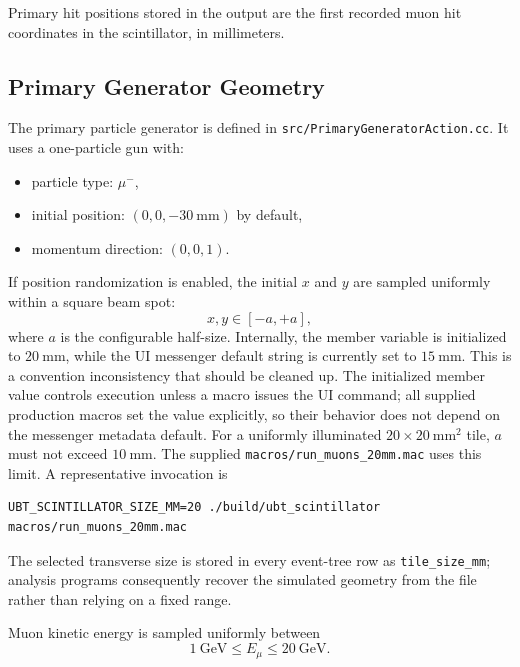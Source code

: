 Primary hit positions stored in the output are the first recorded muon hit coordinates in the scintillator, in millimeters.

\subsection{Primary Generator Geometry}
\label{sec:primary-generator-geometry}
The primary particle generator is defined in \texttt{src/PrimaryGeneratorAction.cc}. It uses a one-particle gun with:
\begin{itemize}
\item particle type: $\mu^-$,
\item initial position: $(0,0,-30~\mathrm{mm})$ by default,
\item momentum direction: $(0,0,1)$.
\end{itemize}

If position randomization is enabled, the initial $x$ and $y$ are sampled uniformly within a square beam spot:
\[
x, y \in [-a, +a],
\]
where $a$ is the configurable half-size. Internally, the member variable is initialized to $20~\mathrm{mm}$, while the UI messenger default string is currently set to $15~\mathrm{mm}$. This is a convention inconsistency that should be cleaned up.
The initialized member value controls execution unless a macro issues the UI
command; all supplied production macros set the value explicitly, so their
behavior does not depend on the messenger metadata default.
For a uniformly illuminated $20\times20~\mathrm{mm^2}$ tile, $a$ must not
exceed $10~\mathrm{mm}$.  The supplied \texttt{macros/run\_muons\_20mm.mac}
uses this limit.  A representative invocation is
\begin{technicaldetails}
\begin{verbatim}
UBT_SCINTILLATOR_SIZE_MM=20 ./build/ubt_scintillator macros/run_muons_20mm.mac
\end{verbatim}
The selected transverse size is stored in every event-tree row as
\texttt{tile\_size\_mm}; analysis programs consequently recover the simulated
geometry from the file rather than relying on a fixed range.
\end{technicaldetails}

Muon kinetic energy is sampled uniformly between
\[
1~\mathrm{GeV} \le E_\mu \le 20~\mathrm{GeV}.
\]

